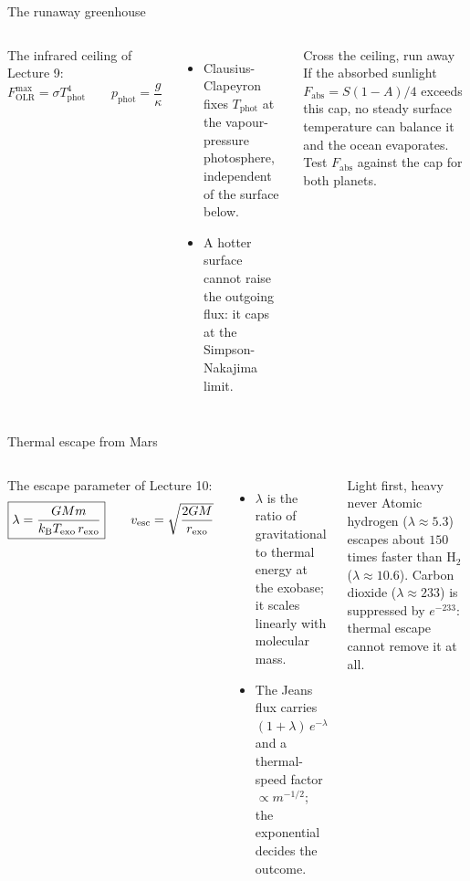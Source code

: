 \documentclass[aspectratio=169, 11pt]{beamer}
\begin{document}
\begin{frame}{The runaway greenhouse}
  \small
  \begin{columns}[T]
    The infrared ceiling of Lecture 9:
    \[
      \boxed{F_\mathrm{OLR}^\mathrm{max} = \sigma T_\mathrm{phot}^4}
      \qquad p_\mathrm{phot} = \frac{g}{\kappa}
    \]
    \begin{itemize}
      \item Clausius-Clapeyron fixes $T_\mathrm{phot}$ at the vapour-pressure photosphere, independent of the surface below.
      \item A hotter surface cannot raise the outgoing flux: it caps at the Simpson-Nakajima limit.
    \end{itemize}

    \begin{block}{Cross the ceiling, run away}
      If the absorbed sunlight $F_\mathrm{abs} = S(1-A)/4$ exceeds this cap, no steady surface temperature can balance it and the ocean evaporates. Test $F_\mathrm{abs}$ against the cap for both planets.
    \end{block}
  \end{columns}
  \vspace{-2pt}
\end{frame}

\begin{frame}{Thermal escape from Mars}
  \small
  \begin{columns}[T]
    The escape parameter of Lecture 10:
    \[
      \boxed{\lambda = \frac{GMm}{k_{\mathrm{B}} T_\mathrm{exo}\,r_\mathrm{exo}}}
      \qquad v_\mathrm{esc} = \sqrt{\frac{2GM}{r_\mathrm{exo}}}
    \]
    \begin{itemize}
      \item $\lambda$ is the ratio of gravitational to thermal energy at the exobase; it scales linearly with molecular mass.
      \item The Jeans flux carries $(1+\lambda)\,e^{-\lambda}$ and a thermal-speed factor $\propto m^{-1/2}$; the exponential decides the outcome.
    \end{itemize}

    \begin{block}{Light first, heavy never}
      Atomic hydrogen ($\lambda \approx 5.3$) escapes about $150$ times faster than $\mathrm{H_2}$ ($\lambda \approx 10.6$). Carbon dioxide ($\lambda \approx 233$) is suppressed by $e^{-233}$: thermal escape cannot remove it at all.
    \end{block}
  \end{columns}
  \vskip2pt\relax
\end{frame}
\end{document}
